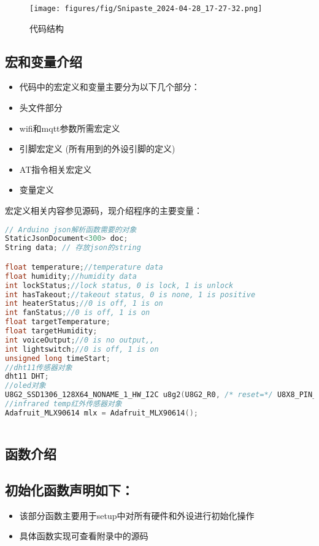 \documentclass[12pt,hyperref,a4paper,UTF8]{ctexart}
\begin{document}
    \begin{figure}[H]
        \centering
        \texttt{[image: figures/fig/Snipaste\_2024-04-28\_17-27-32.png]}
        \caption{代码结构}
        \label{fig:enter-label}
    \end{figure}



\subsection*{宏和变量介绍}

\begin{itemize}
  \item 代码中的宏定义和变量主要分为以下几个部分：
  \item 头文件部分
  \item wifi和mqtt参数所需宏定义
  \item 引脚宏定义 (所有用到的外设引脚的定义)
  \item AT指令相关宏定义
  \item 变量定义
\end{itemize}

宏定义相关内容参见源码，现介绍程序的主要变量：
\begin{lstlisting}[language=C++]
// Arduino json解析函数需要的对象
StaticJsonDocument<300> doc;
String data; // 存放json的string

float temperature;//temperature data
float humidity;//humidity data
int lockStatus;//lock status, 0 is lock, 1 is unlock
int hasTakeout;//takeout status, 0 is none, 1 is positive
int heaterStatus;//0 is off, 1 is on
int fanStatus;//0 is off, 1 is on
float targetTemperature;
float targetHumidity;
int voiceOutput;//0 is no output,,
int lightswitch;//0 is off, 1 is on
unsigned long timeStart;
//dht11传感器对象
dht11 DHT;
//oled对象
U8G2_SSD1306_128X64_NONAME_1_HW_I2C u8g2(U8G2_R0, /* reset=*/ U8X8_PIN_NONE);
//infrared temp红外传感器对象
Adafruit_MLX90614 mlx = Adafruit_MLX90614(); 
  
\end{lstlisting}








\subsection*{函数介绍}
\subsection*{初始化函数声明如下：}
\begin{itemize}
  \item 该部分函数主要用于setup中对所有硬件和外设进行初始化操作
  \item 具体函数实现可查看附录中的源码
\end{itemize}
\end{document}
